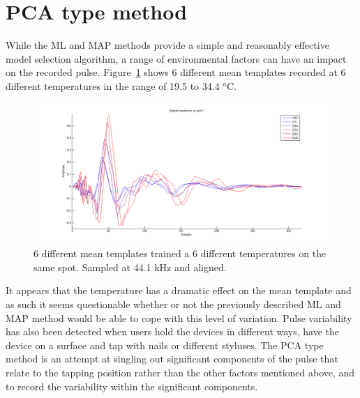 \section{PCA type method}\label{sec:APRpca}
While the ML and MAP methods provide a simple and reasonably effective model selection algorithm, a range of environmental factors can have an impact on the recorded pulse. Figure~\ref{fig:shiftOverTemperature} shows 6 different mean templates recorded at 6 different temperatures in the range of 19.5 to 34.4 $^o$C.

\begin{figure}[!]
\centering
\includegraphics[width=150mm]{shiftOverTemperature.png}
\caption{6 different mean templates trained a 6 different temperatures on the same spot. Sampled at 44.1 kHz and aligned.}\label{fig:shiftOverTemperature}
\end{figure}
It appears that the temperature has a dramatic effect on the mean template and as such it seems questionable whether or not the previously described ML and MAP method would be able to cope with this level of variation. Pulse variability has also been detected when users hold the devices in different ways, have the device on a surface and tap with nails or different styluses. The PCA type method is an attempt at singling out significant components of the pulse that relate to the tapping position rather than the other factors mentioned above, and to record the variability within the significant components.

